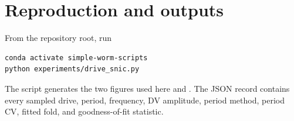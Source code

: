 \documentclass[11pt]{article}
\begin{document}
\section{Reproduction and outputs}

From the repository root, run
\begin{verbatim}
conda activate simple-worm-scripts
python experiments/drive_snic.py
\end{verbatim}

The script generates the two figures used here and
. The JSON record contains every
sampled drive, period, frequency, DV amplitude, period method, period CV,
fitted fold, and goodness-of-fit statistic.
\end{document}
